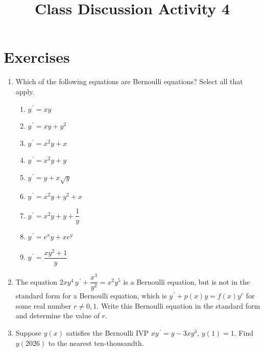 \documentclass{ximera}
\begin{document}
\begin{abstract}
 \end{abstract}

    \title{Class Discussion Activity 4}
    
    \maketitle

\section*{Exercises}

\begin{enumerate}[label=(\arabic*)]


\item Which of the following equations are Bernoulli equations?  Select all that apply.

\begin{enumerate}[label=(\alph*)]
	\item $y^{\,\prime}=xy$
    \item $y^{\,\prime}=xy+y^2$  %
    \item $y^{\,\prime}=x^2y+x$
    \item $y^{\,\prime}=x^2y+y$
    \item $y^{\,\prime}=y+x\sqrt{y}$   %
    \item $y^{\,\prime}=x^2y+y^2+x$ 
    \item $y^{\,\prime}=x^2y+y+\dfrac{1}{y}$   %
    \item $y^{\,\prime}=e^x y +x e^y$ 
    \item $y^{\,\prime}=\dfrac{xy^2+1}{y}$ %
\end{enumerate}


\item The equation $2xy^4\,y^{\,\prime}+\dfrac{x^3}{y^2}=x^2y^5$ is a Bernoulli equation, but is not in the standard form for a Bernoulli equation, which is $y^{\,\prime}+p(x)y=f(x)y^r$ for some real number $r\neq 0,1$.  Write this Bernoulli equation in the standard form and determine the value of $r$. 




\item Suppose $y(x)$ satisfies the Bernoulli IVP $xy^{\,\prime}=y-3xy^3$, $y(1)=1$.  Find $y(2026)$ to the nearest ten-thousandth.


\end{enumerate}
\end{document}
